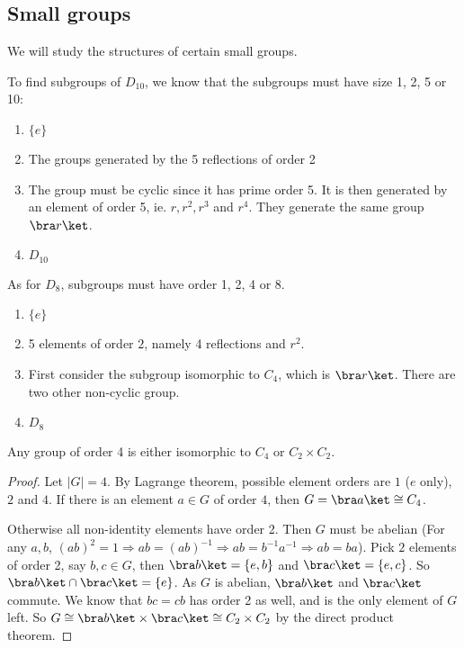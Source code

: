 \documentclass[a4paper]{article}
\begin{document}
\subsection{Small groups}
We will study the structures of certain small groups.
\begin{eg}
  To find subgroups of $D_{10}$, we know that the subgroups must have size 1, 2, 5 or 10:
  \begin{enumerate}[label=\arabic{*}:]
    \item $\{e\}$
    \item The groups generated by the 5 reflections of order 2
      \setcounter{enumi}{4}
    \item The group must be cyclic since it has prime order 5. It is then generated by an element of order 5, ie. $r, r^2, r^3$ and $r^4$. They generate the same group $\bra r\ket$.
      \setcounter{enumi}{9}
    \item $D_{10}$
  \end{enumerate}

  As for $D_8$, subgroups must have order 1, 2, 4 or 8.
  \begin{enumerate}[label=\arabic{*}:]
    \item $\{e\}$
    \item 5 elements of order $2$, namely 4 reflections and $r^2$.
      \setcounter{enumi}{3}
    \item First consider the subgroup isomorphic to $C_4$, which is $\bra r\ket$. There are two other non-cyclic group.
      \setcounter{enumi}{7}
    \item $D_8$
  \end{enumerate}
\end{eg}

\begin{prop}
  Any group of order 4 is either isomorphic to $C_4$ or $C_2\times C_2$.
\end{prop}

\begin{proof}
  Let $|G| = 4$. By Lagrange theorem, possible element orders are $1$ ($e$ only), $2$ and $4$. If there is an element $a\in G$ of order $4$, then $G = \bra a\ket \cong C_4$.

  Otherwise all non-identity elements have order 2. Then $G$ must be abelian (For any $a, b$, $(ab)^2 = 1 \Rightarrow ab = (ab)^{-1} \Rightarrow ab = b^{-1}a^{-1} \Rightarrow ab = ba$).
  Pick $2$ elements  of order 2, say $b, c\in G$, then $\bra b\ket=\{e, b\}$ and $\bra c\ket = \{e, c\}$. So $\bra b\ket\cap \bra c\ket = \{e\}$. As $G$ is abelian, $\bra b\ket$ and $\bra c\ket$ commute. We know that $bc = cb$ has order 2 as well, and is the only element of $G$ left. So $G \cong \bra b\ket\times \bra c\ket \cong C_2\times C_2$ by the direct product theorem.
\end{proof}
\end{document}
